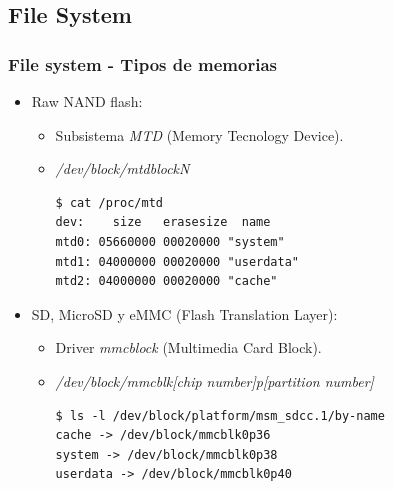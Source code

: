 \subsection{File System}
\begin{frame}[fragile]
  \frametitle{File system - Tipos de memorias}
  \begin{itemize}
      \item Raw NAND flash:
      \begin{itemize}
    \item Subsistema \textit{MTD} (Memory Tecnology Device).
    
    \item \textit{/dev/block/mtdblockN}
    
    \begin{lstlisting}
$ cat /proc/mtd                                                 
dev:    size   erasesize  name
mtd0: 05660000 00020000 "system"
mtd1: 04000000 00020000 "userdata"
mtd2: 04000000 00020000 "cache"
    \end{lstlisting}
      \end{itemize} 
      
      \item SD, MicroSD y eMMC (Flash Translation Layer):
      \begin{itemize}
    \item Driver \textit{mmcblock} (Multimedia Card Block).
    
    \item \textit{/dev/block/mmcblk[chip number]p[partition number]}
    
    \begin{lstlisting}
$ ls -l /dev/block/platform/msm_sdcc.1/by-name
cache -> /dev/block/mmcblk0p36
system -> /dev/block/mmcblk0p38
userdata -> /dev/block/mmcblk0p40
    \end{lstlisting}
      \end{itemize}
  \end{itemize}
\end{frame}

